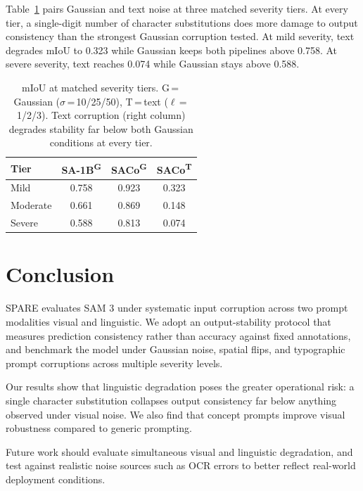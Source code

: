 \documentclass[10pt,twocolumn,letterpaper]{article}
\begin{document}
Table~\ref{tab:crossmodal} pairs Gaussian and text noise at three
matched severity tiers.
At every tier, a single-digit number of character substitutions does more
damage to output consistency than the strongest Gaussian corruption tested.
At mild severity, text degrades mIoU to 0.323
while Gaussian keeps both pipelines above 0.758. At severe severity, text reaches 0.074 while Gaussian stays above 0.588.
\begin{table}[h]
\centering
\footnotesize
\setlength{\tabcolsep}{5pt}
\begin{tabular}{lccc}
\hline
Tier & SA-1B\textsuperscript{G} & SACo\textsuperscript{G} & SACo\textsuperscript{T} \\
\hline
Mild     & 0.758 & 0.923 & 0.323 \\
Moderate & 0.661 & 0.869 & 0.148 \\
Severe   & 0.588 & 0.813 & 0.074 \\
\hline
\end{tabular}
\vspace{3pt}
\caption{mIoU at matched severity tiers.
         G\,=\,Gaussian ($\sigma$\,=\,10/25/50),
         T\,=\,text ($\ell$\,=\,1/2/3).
         Text corruption (right column) degrades stability far below
         both Gaussian conditions at every tier.}
\label{tab:crossmodal}
\end{table}
\section{Conclusion}
\label{sec:conc}
SPARE evaluates SAM 3 under systematic input corruption across two prompt modalities visual and linguistic. We adopt an output-stability protocol that measures prediction consistency rather than accuracy against fixed annotations, and benchmark the model under Gaussian noise, spatial flips, and typographic prompt corruptions across multiple severity levels.


Our results show that linguistic degradation poses the greater operational risk: a single character substitution collapses output consistency far below anything observed under visual noise. We also find that concept prompts improve visual robustness compared to generic prompting.


Future work should evaluate simultaneous visual and linguistic degradation, and test against realistic noise sources such as OCR errors to better reflect real-world deployment conditions.
{\small


}
\end{document}
